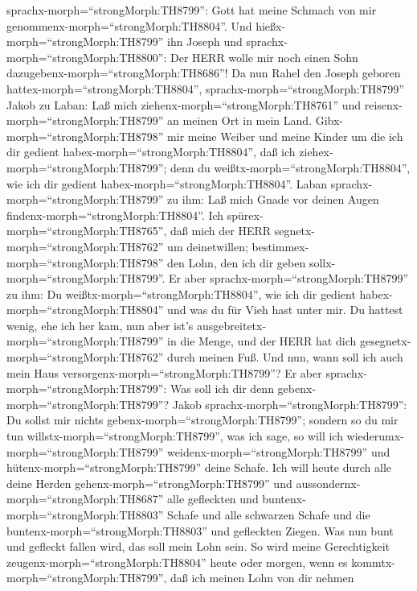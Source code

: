 sprachx-morph=``strongMorph:TH8799'': Gott hat meine Schmach von mir
genommenx-morph=``strongMorph:TH8804''.  Und
hießx-morph=``strongMorph:TH8799'' ihn Joseph und
sprachx-morph=``strongMorph:TH8800'': Der HERR wolle mir noch einen Sohn
dazugebenx-morph=``strongMorph:TH8686''!  Da nun Rahel den
Joseph geboren hattex-morph=``strongMorph:TH8804'',
sprachx-morph=``strongMorph:TH8799'' Jakob zu Laban: Laß mich
ziehenx-morph=``strongMorph:TH8761'' und
reisenx-morph=``strongMorph:TH8799'' an meinen Ort in mein Land.
 Gibx-morph=``strongMorph:TH8798'' mir meine Weiber und
meine Kinder um die ich dir gedient habex-morph=``strongMorph:TH8804'',
daß ich ziehex-morph=``strongMorph:TH8799''; denn du
weißtx-morph=``strongMorph:TH8804'', wie ich dir gedient
habex-morph=``strongMorph:TH8804''.  Laban
sprachx-morph=``strongMorph:TH8799'' zu ihm: Laß mich Gnade vor deinen
Augen findenx-morph=``strongMorph:TH8804''. Ich
spürex-morph=``strongMorph:TH8765'', daß mich der HERR
segnetx-morph=``strongMorph:TH8762'' um deinetwillen; 
bestimmex-morph=``strongMorph:TH8798'' den Lohn, den ich dir geben
sollx-morph=``strongMorph:TH8799''.  Er aber
sprachx-morph=``strongMorph:TH8799'' zu ihm: Du
weißtx-morph=``strongMorph:TH8804'', wie ich dir gedient
habex-morph=``strongMorph:TH8804'' und was du für Vieh hast unter mir.
 Du hattest wenig, ehe ich her kam, nun aber ist's
ausgebreitetx-morph=``strongMorph:TH8799'' in die Menge, und der HERR
hat dich gesegnetx-morph=``strongMorph:TH8762'' durch meinen Fuß. Und
nun, wann soll ich auch mein Haus
versorgenx-morph=``strongMorph:TH8799''?  Er aber
sprachx-morph=``strongMorph:TH8799'': Was soll ich dir denn
gebenx-morph=``strongMorph:TH8799''? Jakob
sprachx-morph=``strongMorph:TH8799'': Du sollst mir nichts
gebenx-morph=``strongMorph:TH8799''; sondern so du mir tun
willstx-morph=``strongMorph:TH8799'', was ich sage, so will ich
wiederumx-morph=``strongMorph:TH8799''
weidenx-morph=``strongMorph:TH8799'' und
hütenx-morph=``strongMorph:TH8799'' deine Schafe.  Ich will
heute durch alle deine Herden gehenx-morph=``strongMorph:TH8799'' und
aussondernx-morph=``strongMorph:TH8687'' alle gefleckten und
buntenx-morph=``strongMorph:TH8803'' Schafe und alle schwarzen Schafe
und die buntenx-morph=``strongMorph:TH8803'' und gefleckten Ziegen. Was
nun bunt und gefleckt fallen wird, das soll mein Lohn sein.
 So wird meine Gerechtigkeit
zeugenx-morph=``strongMorph:TH8804'' heute oder morgen, wenn es
kommtx-morph=``strongMorph:TH8799'', daß ich meinen Lohn von dir nehmen
